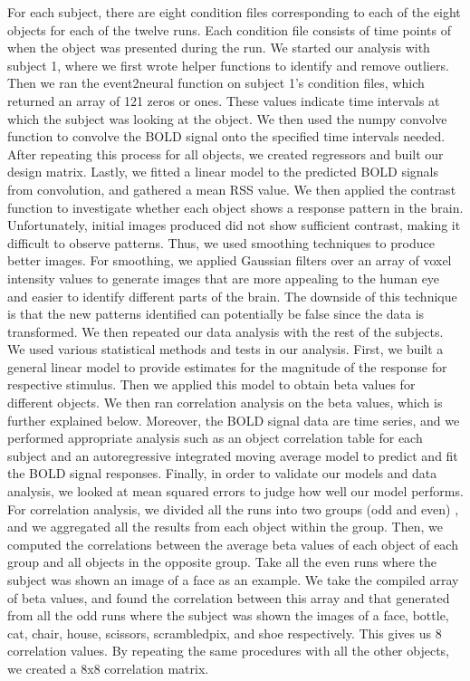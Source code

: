 \documentclass[11pt,twocolumn]{article}
\begin{document}
For each subject, there are eight condition files corresponding 
to each of the eight objects for each of the twelve runs. Each
condition file consists of time points of when the object was presented 
during the run. We started our analysis with subject 1, where we first wrote 
helper functions to identify and remove outliers.  Then we ran 
the event2neural function on subject 1's condition files, which returned an 
array of 121 zeros or ones. These values indicate
time intervals at which the subject was looking at the object.
We then used the numpy convolve function to convolve the BOLD signal 
onto the specified time intervals needed. After repeating this process 
for all objects, we created regressors and built our design matrix. 
Lastly, we fitted a linear model to the predicted BOLD signals 
from convolution, and gathered a mean RSS value. We then applied the contrast
function to investigate whether each object shows a response pattern in the brain.
Unfortunately, initial images produced did not show sufficient contrast, 
making it difficult to observe patterns. Thus, we used smoothing techniques to 
produce better images. For smoothing, we applied Gaussian filters over an
array of voxel intensity values to generate images that are more appealing
to the human eye and easier to identify different parts of the brain.
The downside of this technique is that the new patterns identified can
potentially be false since the data is transformed. We then repeated our 
data analysis with the rest of the subjects.
 \\

We used various statistical methods and tests in our analysis. First,
we built a general linear model to provide estimates for the magnitude of
the response for respective stimulus. Then we applied this model to obtain
beta values for different objects. We then ran correlation analysis on the
beta values, which is further explained below. Moreover, the BOLD signal 
data are time series, and we performed appropriate analysis such as 
an object correlation table for each subject and an autoregressive integrated
moving average model to predict and fit the BOLD signal responses. 
Finally, in order to validate our models and data analysis, we looked 
at mean squared errors to judge how well our model performs. \\

For correlation analysis, we divided all the runs into two groups (odd and even)
, and we aggregated all the results from each object within the group. Then, 
we computed the correlations between the average beta values of each object 
of each group and all objects in the opposite group. Take all the even runs 
where the subject was shown an image of a face as an example. We take 
the compiled array of beta values, and found the correlation between this 
array and that generated from all the odd runs where the subject was shown 
the images of a face, bottle, cat, chair, house, scissors, scrambledpix, and 
shoe respectively. This gives us 8 correlation values. By repeating the same 
procedures with all the other objects, we created a 8x8 correlation matrix. \\
\end{document}
